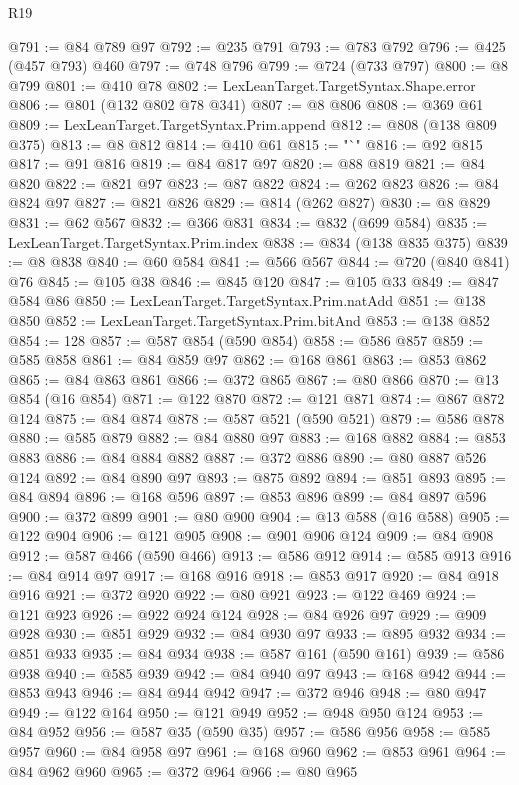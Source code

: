 \begin{lexlean}{R19}
\begin{coremodule}
{{{{{{{{{{{{{{{{{{{{{{{{{{{{{{{{{{{{{{{{{{{{{{{{{{{{{{{{{{{{{{{{{{{{{{{{{{{{{{{{{{{{{{{@791 := @84 @789 @97
@792 := @235 @791
@793 := @783 @792
@796 := @425 (@457 @793) @460
@797 := @748 @796
@799 := @724 (@733 @797)
@800 := @8 @799
@801 := @410 @78
@802 := LexLeanTarget.TargetSyntax.Shape.error
@806 := @801 (@132 @802 @78 @341)
@807 := @8 @806
@808 := @369 @61
@809 := LexLeanTarget.TargetSyntax.Prim.append
@812 := @808 (@138 @809 @375)
@813 := @8 @812
@814 := @410 @61
@815 := "`"
@816 := @92 @815
@817 := @91 @816
@819 := @84 @817 @97
@820 := @88 @819
@821 := @84 @820
@822 := @821 @97
@823 := @87 @822
@824 := @262 @823
@826 := @84 @824 @97
@827 := @821 @826
@829 := @814 (@262 @827)
@830 := @8 @829
@831 := @62 @567
@832 := @366 @831
@834 := @832 (@699 @584)
@835 := LexLeanTarget.TargetSyntax.Prim.index
@838 := @834 (@138 @835 @375)
@839 := @8 @838
@840 := @60 @584
@841 := @566 @567
@844 := @720 (@840 @841) @76
@845 := @105 @38
@846 := @845 @120
@847 := @105 @33
@849 := @847 @584 @86
@850 := LexLeanTarget.TargetSyntax.Prim.natAdd
@851 := @138 @850
@852 := LexLeanTarget.TargetSyntax.Prim.bitAnd
@853 := @138 @852
@854 := 128
@857 := @587 @854 (@590 @854)
@858 := @586 @857
@859 := @585 @858
@861 := @84 @859 @97
@862 := @168 @861
@863 := @853 @862
@865 := @84 @863 @861
@866 := @372 @865
@867 := @80 @866
@870 := @13 @854 (@16 @854)
@871 := @122 @870
@872 := @121 @871
@874 := @867 @872 @124
@875 := @84 @874
@878 := @587 @521 (@590 @521)
@879 := @586 @878
@880 := @585 @879
@882 := @84 @880 @97
@883 := @168 @882
@884 := @853 @883
@886 := @84 @884 @882
@887 := @372 @886
@890 := @80 @887 @526 @124
@892 := @84 @890 @97
@893 := @875 @892
@894 := @851 @893
@895 := @84 @894
@896 := @168 @596
@897 := @853 @896
@899 := @84 @897 @596
@900 := @372 @899
@901 := @80 @900
@904 := @13 @588 (@16 @588)
@905 := @122 @904
@906 := @121 @905
@908 := @901 @906 @124
@909 := @84 @908
@912 := @587 @466 (@590 @466)
@913 := @586 @912
@914 := @585 @913
@916 := @84 @914 @97
@917 := @168 @916
@918 := @853 @917
@920 := @84 @918 @916
@921 := @372 @920
@922 := @80 @921
@923 := @122 @469
@924 := @121 @923
@926 := @922 @924 @124
@928 := @84 @926 @97
@929 := @909 @928
@930 := @851 @929
@932 := @84 @930 @97
@933 := @895 @932
@934 := @851 @933
@935 := @84 @934
@938 := @587 @161 (@590 @161)
@939 := @586 @938
@940 := @585 @939
@942 := @84 @940 @97
@943 := @168 @942
@944 := @853 @943
@946 := @84 @944 @942
@947 := @372 @946
@948 := @80 @947
@949 := @122 @164
@950 := @121 @949
@952 := @948 @950 @124
@953 := @84 @952
@956 := @587 @35 (@590 @35)
@957 := @586 @956
@958 := @585 @957
@960 := @84 @958 @97
@961 := @168 @960
@962 := @853 @961
@964 := @84 @962 @960
@965 := @372 @964
@966 := @80 @965
}}}}}}}}}}}}}}}}}}}}}}}}}}}}}}}}}}}}}}}}}}}}}}}}}}}}}}}}}}}}}}}}}}}}}}}}}}}}}}}}}}}}}}}
\end{coremodule}
\end{lexlean}
